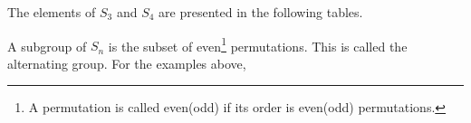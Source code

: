 \begin{example}[$S_3$ and $S_4$]
	The elements of $S_3$ and $S_4$ are presented in the following tables.
	
\end{example}

A subgroup of $S_n$ is the subset of even\footnote{A permutation is called even(odd) if its order is even(odd) permutations.} permutations. This is called the alternating group. For the examples above,

